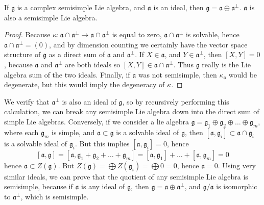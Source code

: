 \begin{lemma}
    If $\mathfrak{g}$ is a complex semisimple Lie algebra, and $\mathfrak{a}$ is an ideal, then $\mathfrak{g} = \mathfrak{a} \oplus \mathfrak{a}^\perp$. $\mathfrak{a}$ is also a semisimple Lie algebra.
\end{lemma}
\begin{proof}
    Because $\kappa: \mathfrak{a} \cap \mathfrak{a}^\perp \to \mathfrak{a} \cap \mathfrak{a}^\perp$ is equal to zero, $\mathfrak{a} \cap \mathfrak{a}^\perp$ is solvable, hence $\mathfrak{a} \cap \mathfrak{a}^\perp = (0)$, and by dimension counting we certainly have the vector space structure of $\mathfrak{g}$ as a direct sum of $\mathfrak{a}$ and $\mathfrak{a}^\perp$. If $X \in \mathfrak{a}$, and $Y \in \mathfrak{a}^\perp$, then $[X,Y] = 0$, because $\mathfrak{a}$ and $\mathfrak{a}^\perp$ are both ideals so $[X,Y] \in \mathfrak{a} \cap \mathfrak{a}^\perp$. Thus $\mathfrak{g}$ really is the Lie algebra sum of the two ideals. Finally, if $\mathfrak{a}$ was not semisimple, then $\kappa_\mathfrak{a}$ would be degenerate, but this would imply the degeneracy of $\kappa$.
\end{proof}

We verify that $\mathfrak{a}^\perp$ is also an ideal of $\mathfrak{g}$, so by recursively performing this calculation, we can break any semisimple Lie algebra down into the direct sum of simple Lie algebras. Conversely, if we consider a lie algebra $\mathfrak{g} = \mathfrak{g}_1 \oplus \mathfrak{g}_2 \oplus \dots \oplus \mathfrak{g}_m$, where each $\mathfrak{g}_m$ is simple, and $\mathfrak{a} \subset \mathfrak{g}$ is a solvable ideal of $\mathfrak{g}$, then $[\mathfrak{a}, \mathfrak{g}_i] \subset \mathfrak{a} \cap \mathfrak{g}_i$ is a solvable ideal of $\mathfrak{g}_i$. But this implies $[\mathfrak{a}, \mathfrak{g}_i] = 0$, hence
%
\[ [\mathfrak{a}, \mathfrak{g}] = [\mathfrak{a}, \mathfrak{g}_1 + \mathfrak{g}_2 + \dots + \mathfrak{g}_m] = [\mathfrak{a}, \mathfrak{g}_1] + \dots + [\mathfrak{a}, \mathfrak{g}_m] = 0 \]
%
hence $\mathfrak{a} \subset Z(\mathfrak{g})$. But $Z(\mathfrak{g}) = \bigoplus Z(\mathfrak{g}_i) = \bigoplus 0 = 0$, hence $\mathfrak{a} = 0$. Using very similar ideals, we can prove that the quotient of any semisimple Lie algebra is semisimple, because if $\mathfrak{a}$ is any ideal of $\mathfrak{g}$, then $\mathfrak{g} = \mathfrak{a} \oplus \mathfrak{a}^\perp$, and $\mathfrak{g}/\mathfrak{a}$ is isomorphic to $\mathfrak{a}^\perp$, which is semisimple.

